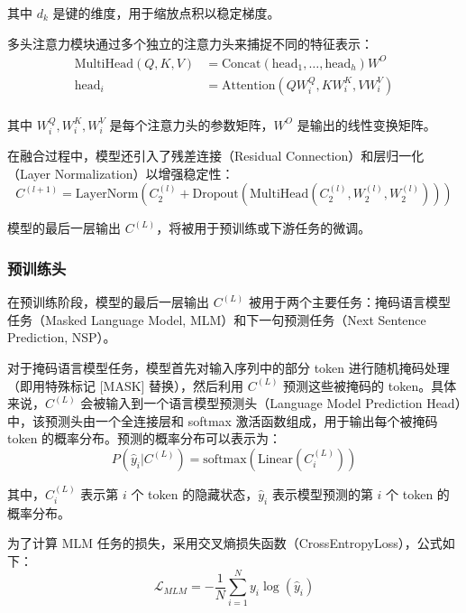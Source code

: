 \documentclass[12pt, a4paper]{ctexart}
\begin{document}
其中 $d_k$ 是键的维度，用于缩放点积以稳定梯度。

多头注意力模块通过多个独立的注意力头来捕捉不同的特征表示：
\begin{equation}
    \begin{split}
        \text{MultiHead}(Q, K, V) &= \text{Concat}(\text{head}_1, \dots, \text{head}_h)W^O \\
        \text{head}_i &= \text{Attention}(QW_i^Q, KW_i^K, VW_i^V) \\
    \end{split}
\end{equation}

其中 $W_i^Q, W_i^K, W_i^V$ 是每个注意力头的参数矩阵，$W^O$ 是输出的线性变换矩阵。

在融合过程中，模型还引入了残差连接（Residual Connection）和层归一化（Layer Normalization）以增强稳定性：
\begin{equation}
    C^{(l+1)} = \text{LayerNorm}(C^{(l)}_2 + \text{Dropout}(\text{MultiHead}(C^{(l)}_2, W^{(l)}_2, W^{(l)}_2)))
\end{equation}

模型的最后一层输出 $C^{(L)}$，将被用于预训练或下游任务的微调。

\subsubsection{预训练头}
在预训练阶段，模型的最后一层输出 $C^{(L)}$ 被用于两个主要任务：掩码语言模型任务（Masked Language Model, MLM）和下一句预测任务（Next Sentence Prediction, NSP）。

对于掩码语言模型任务，模型首先对输入序列中的部分 token 进行随机掩码处理（即用特殊标记 [MASK] 替换），然后利用 $C^{(L)}$ 预测这些被掩码的 token。具体来说，$C^{(L)}$ 会被输入到一个语言模型预测头（Language Model Prediction Head）中，该预测头由一个全连接层和 softmax 激活函数组成，用于输出每个被掩码 token 的概率分布。预测的概率分布可以表示为：
\begin{equation}
    P(\hat{y}_i | C^{(L)}) = \text{softmax}(\text{Linear}(C^{(L)}_i))
\end{equation}

其中，$C^{(L)}_i$ 表示第 $i$ 个 token 的隐藏状态，$\hat{y}_i$ 表示模型预测的第 $i$ 个 token 的概率分布。

为了计算 MLM 任务的损失，采用交叉熵损失函数（CrossEntropyLoss），公式如下：
\begin{equation}
    \mathcal{L}_{MLM} = -\frac{1}{N} \sum_{i=1}^{N} y_i \log(\hat{y}_i)
\end{equation}
\end{document}
